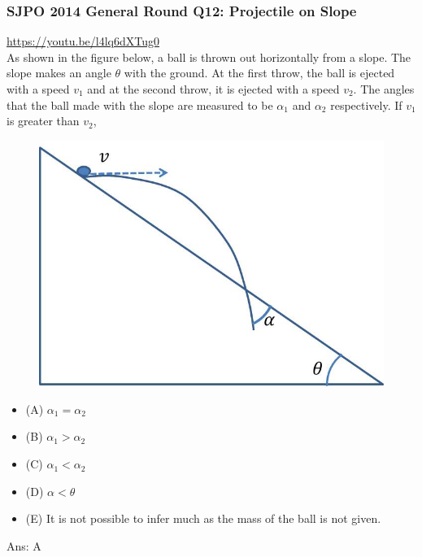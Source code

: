 \documentclass{article}
\begin{document}
\begin{samepage}
\subsubsection{SJPO 2014 General Round Q12: Projectile on Slope}
\url{https://youtu.be/l4lq6dXTug0}\\[10pt]
As shown in the figure below, a ball is thrown out horizontally from a slope. The slope makes an angle $\theta$ with the ground. At the first throw, the ball is ejected with a speed $v_1$ and at the second throw, it is ejected with a speed $v_2$. The angles that the ball made with the slope are measured to be $\alpha_1$ and $\alpha_2$ respectively. If $v_1$ is greater than $v_2$,\\
 \begin{figure} 
\includegraphics[width=\linewidth]{images/2014q12.png}
\end{figure}
\begin{itemize}
\item[](A) $\alpha_1=\alpha_2$
\item[](B) $\alpha_1>\alpha_2$
\item[](C) $\alpha_1<\alpha_2$
\item[](D) $\alpha<\theta$
\item[](E) It is not possible to infer much as the mass of the ball is not given.
\end{itemize}
Ans: \ifpaper A \fi \\[10pt]
\end{samepage}



\end{document}
